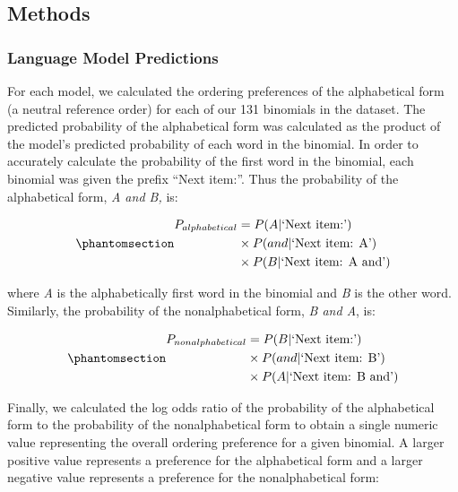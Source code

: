 \documentclass[
  10pt,
  nohyperref]{acl}
\begin{document}
\subsection{Methods}\label{methods}

\subsubsection{Language Model
Predictions}\label{language-model-predictions}

For each model, we calculated the ordering preferences of the
alphabetical form (a neutral reference order) for each of our 131
binomials in the dataset. The predicted probability of the alphabetical
form was calculated as the product of the model's predicted probability
of each word in the binomial. In order to accurately calculate the
probability of the first word in the binomial, each binomial was given
the prefix ``Next item:''. Thus the probability of the alphabetical
form, \emph{A and B,} is:

\begin{equation}\phantomsection\label{eq-probalpha}{
\begin{aligned}
    P_{alphabetical} & = P(A|\text{`Next item:'} )\\      
    & \times P(and|\text{`Next item: A'})\\      
    & \times P(B|\text{`Next item: A and'})
\end{aligned}
}\end{equation}

\noindent where \emph{A} is the alphabetically first word in the
binomial and \emph{B} is the other word. Similarly, the probability of
the nonalphabetical form, \emph{B and A}, is:

\begin{equation}\phantomsection\label{eq-probnonalpha}{
\begin{aligned}    
P_{nonalphabetical} & = P(B|\text{`Next item:'})\\
& \times P(and|\text{`Next item: B'})\\
& \times P(A|\text{`Next item: B and'})
\end{aligned}
}\end{equation}

Finally, we calculated the log odds ratio of the probability of the
alphabetical form to the probability of the nonalphabetical form to
obtain a single numeric value representing the overall ordering
preference for a given binomial. A larger positive value represents a
preference for the alphabetical form and a larger negative value
represents a preference for the nonalphabetical form:
\end{document}
